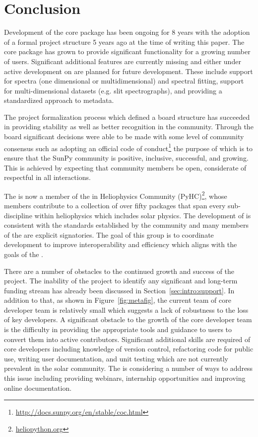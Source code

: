 \section{Conclusion}
\label{sec:conclusion}
Development of the \sunpypkg core package has been ongoing for 8 years with the adoption of a formal project structure 5 years ago at the time of writing this paper.
The core package has grown to provide significant functionality for a growing number of users.
Significant additional features are currently missing and either under active development on are planned for future development.
These include support for spectra (one dimensional or multidimensional) and spectral fitting, support for multi-dimensional datasets (e.g. slit spectrographs), and providing a standardized approach to metadata.

The project formalization process which defined a board structure has succeeded in providing stability as well as better recognition in the community.
Through the board significant decisions were able to be made with some level of community consensus such as adopting an official code of conduct\footnote{\url{http://docs.sunpy.org/en/stable/coc.html}} the purpose of which is to ensure that the SunPy community is positive, inclusive, successful, and growing.
This is achieved by expecting that community members be open, considerate of respectful in all interactions.

The \sunpyproj is now a member of the \python in Heliophysics Community (PyHC)\footnote{\url{heliopython.org}}, whose members contribute to a collection of over fifty \python packages that span every sub-discipline within heliophysics which includes solar physics. The development of \sunpypkg  is consistent with the standards established by the community \citep{pyhcStandards} and many members of
the \sunpyproj are explicit signatories. The goal of this group is to coordinate \python development to improve interoperability and efficiency which aligns with the goals of the  \sunpyproj.

There are a number of obstacles to the continued growth and success of the project. The inability of the project to identify any significant and long-term funding stream has already been discussed in Section~\ref{sec:intro:support}. In addition to that, as shown in Figure~\ref{fig:metafig}, the current team of core developer team is relatively small which suggests a lack of robustness to the loss of key developers.
A significant obstacle to the growth of the core developer team is the difficulty in providing the appropriate tools and guidance to users to convert them into active contributors.
Significant additional skills are required of core developers including knowledge of version control,  refactoring code for public use, writing user documentation, and unit testing which are not currently prevalent in the solar community.
The \sunpyproj is considering a number of ways to address this issue including providing webinars, internship opportunities and improving online documentation.

